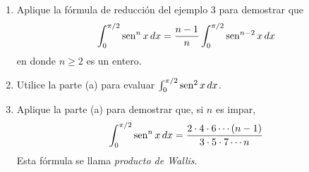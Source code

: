 \item 
    \begin{enumerate}
        \item[(a)] Aplique la fórmula de reducción del ejemplo 3 para demostrar que
        \[ \int_{0}^{\pi/2} \operatorname{sen}^n x \, dx = \frac{n - 1}{n} \int_{0}^{\pi/2} \operatorname{sen}^{n-2} x \, dx \]
        en donde $n \ge 2$ es un entero.
        \item[(b)] Utilice la parte (a) para evaluar $\int_{0}^{\pi/2} \operatorname{sen}^2 x \, dx$.
        \item[(c)] Aplique la parte (a) para demostrar que, si $n$ es impar,
        \[ \int_{0}^{\pi/2} \operatorname{sen}^n x \, dx = \frac{2 \cdot 4 \cdot 6 \cdots (n - 1)}{3 \cdot 5 \cdot 7 \cdots n} \]
        Esta fórmula se llama \textit{producto de Wallis}.
    \end{enumerate}
